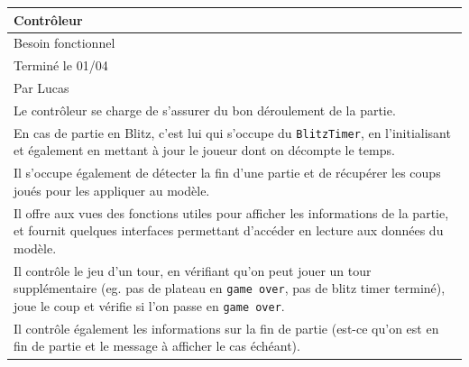 \documentclass[a4paper,12pt]{article}
\begin{document}
\noindent
\setlength{\arrayrulewidth}{1.5pt}
\renewcommand{\arraystretch}{1.5}
\begin{tabularx}{\textwidth}{|X|}
    \hline
    \textbf{Contrôleur}                                                                                                                                                                                                     \\
    \hline
    Besoin fonctionnel                                                                                                                                                                                                      \\
    \hline
    Terminé le 01/04                                                                                                                                                                                                        \\
    Par Lucas                                                                                                                                                                                                               \\
    \hline
    Le contrôleur se charge de s’assurer du bon déroulement de la partie.                                                                                                                                                   \\
    En cas de partie en Blitz, c’est lui qui s’occupe du \texttt{BlitzTimer}, en l’initialisant et également en mettant à jour le joueur dont on décompte le temps.                                                         \\
    Il s’occupe également de détecter la fin d’une partie et de récupérer les coups joués pour les appliquer au modèle.                                                                                                     \\
    Il offre aux vues des fonctions utiles pour afficher les informations de la partie, et fournit quelques interfaces permettant d’accéder en lecture aux données du modèle.                                               \\
    Il contrôle le jeu d’un tour, en vérifiant qu’on peut jouer un tour supplémentaire (eg. pas de plateau en \texttt{game over}, pas de blitz timer terminé), joue le coup et vérifie si l’on passe en \texttt{game over}. \\
    Il contrôle également les informations sur la fin de partie (est-ce qu’on est en fin de partie et le message à afficher le cas échéant).                                                                                \\

\end{tabularx}
\end{document}
